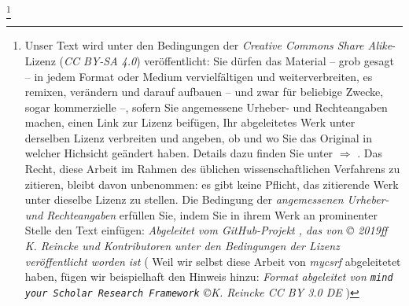 %
%
%
\footnote{\small Unser Text wird unter den Bedingungen der \textit{Creative Commons Share Alike}-Lizenz (\textit{CC BY-SA 4.0}) ver\-öffentlicht: Sie dürfen das Material -- grob gesagt -- in jedem Format oder Medium vervielfältigen und weiterverbreiten, es remixen, verändern und darauf aufbauen -- und zwar für beliebige Zwecke, sogar kommerzielle --, sofern Sie angemessene Urheber- und Rechteangaben machen, einen Link zur Lizenz beifügen, Ihr abgeleitetes Werk unter derselben Lizenz verbreiten und angeben, ob und wo Sie das Original in welcher Hichsicht geändert haben. Details dazu finden Sie unter $\Rightarrow$ .\newline
Das Recht, diese Arbeit im Rahmen des üblichen wissenschaftlichen Verfahrens zu zitieren, bleibt davon unbenommen: es gibt keine Pflicht, das zitierende Werk unter dieselbe Lizenz zu stellen. Die Bedingung der \textit{an\-ge\-mes\-se\-nen Urheber- und Rechteangaben} erfüllen Sie, indem Sie in ihrem Werk an prominenter Stelle den Text einfügen: {\itshape Abgeleitet vom GitHub-Projekt , das von © 2019ff K. Reincke und Kontributoren unter den Bedingungen der Lizenz  veröffentlicht worden ist }\newline
( {\footnotesize Weil wir selbst diese Arbeit von \textit{mycsrf} abgeleitetet haben, fügen wir beispielhaft den Hinweis hinzu: {\itshape Format abgeleitet von \texttt{mind your Scholar Research Framework} \copyright K. Reincke CC BY 3.0 DE  }} ) }

